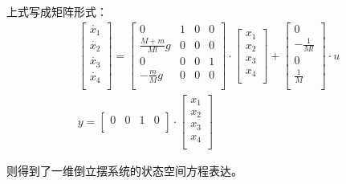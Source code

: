 \documentclass{ctexart}
\begin{document}
				上式写成矩阵形式：
				\begin{gather}
					\begin{bmatrix}
						\dot{x_1}\\
						\dot{x_2}\\
						\dot{x_3}\\
						\dot{x_4}\\
					\end{bmatrix}
					=
					\begin{bmatrix}
						0&1&0&0\\
						\frac{M+m}{Ml}g&0&0&0\\
						0&0&0&1\\
						-\frac{m}{M}g&0&0&0\\
					\end{bmatrix}
					\cdot
					\begin{bmatrix}
						x_1\\
						x_2\\
						x_3\\
						x_4\\
					\end{bmatrix}
					+
					\begin{bmatrix}
						0\\
						-\frac{1}{Ml}\\
						0\\
						\frac{1}{M}\\
					\end{bmatrix}
					\cdot
					u\\
					y=
					\begin{bmatrix}
						0&0&1&0\\
					\end{bmatrix}
					\cdot
					\begin{bmatrix}
						x_1\\
						x_2\\
						x_3\\
						x_4\\
					\end{bmatrix}
				\end{gather}\par
				则得到了一维倒立摆系统的状态空间方程表达。
\end{document}
